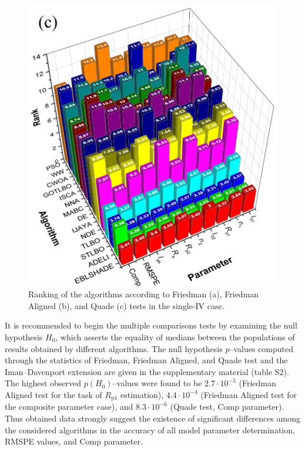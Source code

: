 \documentclass[a4paper,fleqn]{cas-dc}
\begin{document}
\begin{figure}[!ht]
        \includegraphics[width=.76\columnwidth]{QuadeRank}
	  \caption{Ranking of the algorithms according to Friedman (a), Friedman Aligned (b), and Quade (c) tests in the single-IV case.}\label{figRanksSingleIV}
\end{figure}

It is recommended \cite{Derrac2011} to begin the multiple comparisons tests by examining the null hypothesis $H_0$,
which asserts the equality of medians between the populations of results obtained by different algorithms.
The null hypothesis $p$--values computed through the statistics of  Friedman, Friedman Aligned, and Quade test
and the Iman–Davenport extension
are given in the supplementary material (table S2).
The highest observed $p(H_0)$--values were found to be $2.7\cdot10^{-5}$ (Friedman Aligned test for the task of $R_\mathrm{p1}$ estimation),
$4.4\cdot10^{-4}$ (Friedman Aligned test for the composite parameter case),
and $8.3\cdot10^{-6}$ (Quade test, Comp parameter).
Thus obtained data strongly suggest the existence of significant differences
among the considered algorithms in the accuracy of all model parameter determination, RMSPE values, and Comp parameter.
\end{document}
